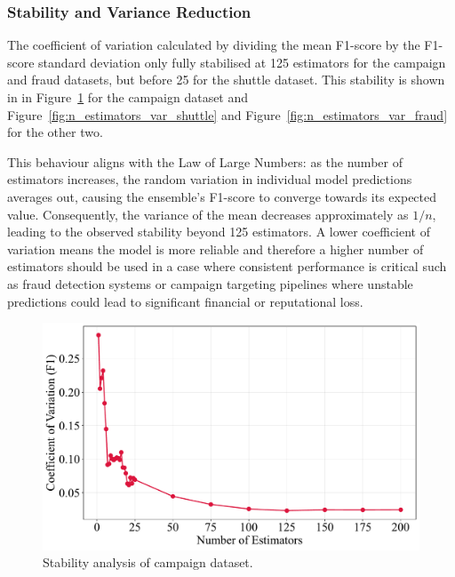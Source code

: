 \documentclass[10pt, conference]{IEEEtran}
\begin{document}



\subsubsection{Stability and Variance Reduction}
The coefficient of variation calculated by dividing the mean F1-score by the F1-score standard deviation only fully stabilised at 125 estimators for the campaign and fraud datasets, but before 25 for the shuttle dataset. This stability is shown in in Figure~\ref{fig:n_estimators_var} for the campaign dataset and Figure~\ref{fig:n_estimators_var_shuttle} and Figure~\ref{fig:n_estimators_var_fraud} for the other two. 

This behaviour aligns with the Law of Large Numbers: as the number of estimators increases, the random variation in individual model predictions averages out, causing the ensemble’s F1-score to converge towards its expected value. Consequently, the variance of the mean decreases approximately as 
$1/n$, leading to the observed stability beyond 125 estimators. A lower coefficient of variation means the model is more reliable and therefore a higher number of estimators should be used in a case where consistent performance is critical such as fraud detection systems or campaign targeting pipelines where unstable predictions could lead to significant financial or reputational loss.

\begin{figure}[H]
	\centering
	\includegraphics[width=0.95\linewidth]{../results/campaign/n_estimators/stability_analysis.pdf}
	\caption{Stability analysis of campaign dataset.}
	\label{fig:n_estimators_var}
\end{figure}
\end{document}

